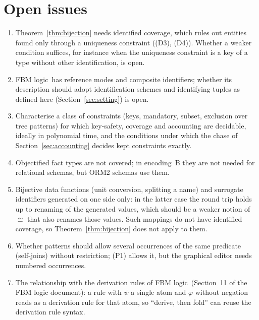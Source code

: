 \documentclass[11pt]{amsart}
\theoremstyle{definition}
\theoremstyle{remark}
\newcommand{\FBM}{FBM logic}
\begin{document}
\section{Open issues}

\begin{enumerate}
  \item Theorem~\ref{thm:bijection} needs identified coverage, which rules
    out entities found only through a uniqueness constraint ((D3), (D4)).
    Whether a weaker condition suffices, for instance when the uniqueness
    constraint is a key of a type without other identification, is open.
  \item \FBM\ has reference modes and composite identifiers; whether its
    description should adopt identification schemes and identifying tuples
    as defined here (Section~\ref{sec:setting}) is open.
  \item \label{oi:decidable} Characterise a class of constraints (keys,
    mandatory, subset, exclusion over tree patterns) for which key-safety,
    coverage and accounting are decidable, ideally in polynomial time, and
    the conditions under which the chase of
    Section~\ref{sec:accounting} decides kept constraints exactly.
  \item Objectified fact types are not covered; in encoding~B they are not
    needed for relational schemas, but ORM2 schemas use them.
  \item Bijective data functions (unit conversion, splitting a name) and
    surrogate identifiers generated on one side only: in the latter case
    the round trip holds up to renaming of the generated values, which
    should be a weaker notion of $\cong$ that also renames those values.
    Such mappings do not have identified coverage, so
    Theorem~\ref{thm:bijection} does not apply to them.
  \item Whether patterns should allow several occurrences of the same
    predicate (self-joins) without restriction; (P1) allows it, but the
    graphical editor needs numbered occurrences.
  \item The relationship with the derivation rules of \FBM\ (Section~11
of
    the FBM logic document): a rule with $\psi$ a single atom and $\varphi$
    without negation reads as a derivation rule for that atom, so
    ``derive, then fold'' can reuse the derivation rule syntax.
\end{enumerate}
\end{document}
